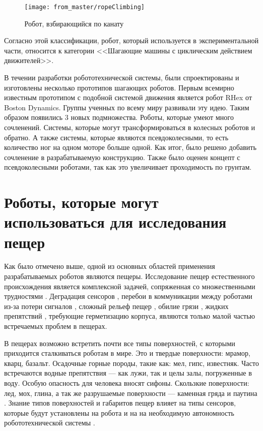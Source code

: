 \begin{figure}[H]
\centering\texttt{[image: from\_master/ropeClimbing]}
\caption{Робот, взбирающийся по канату}
\label{fig:ropeClimbing}
\end{figure}

Согласно этой классификации, робот, который используется в экспериментальной части, относится к категории <<Шагающие машины с циклическим действием движителей>>.

В течении разработки робототехнической системы, были спроектированы и изготовлены несколько прототипов шагающих роботов. Первым всемирно известным прототипом с подобной системой движения является робот RHex \cite{saranliRHexSimpleHighly2001} от Boston Dynamics. Группы ученных по всему миру развивали эту идею. Таким образом появились 3 новых подмножества. Роботы, которые умеют много сочленений. Системы, которые могут трансформироваться в колесных роботов и обратно. А также системы, которые являются псевдоколесными, то есть количество ног на одном моторе больше одной. Как итог, было решено добавить сочленение в разрабатываемую конструкцию. Также было оценен концепт с псевдоколесными роботами, так как это увеличивает проходимость по грунтам.

\section{Роботы, которые могут использоваться для исследования пещер}

Как было отмечено выше, одной из основных областей применения разрабатываемых роботов являются пещеры. Исследование пещер естественного происхождения является комплексной задачей, сопряженная со множественными трудностями \cite{Zhang2017a, Frumkin2019}. Деградация сенсоров \cite{Huang2019}, перебои в коммуникации между роботами из-за потери сигналов \cite{Vaquero2018, Thangavelautham2017}, сложный рельеф пещер \cite{Thangavelautham2017}, обилие грязи \cite{Baker2004}, жидких препятствий \cite{Morris2006}, требующие герметизацию корпуса, являются только малой частью встречаемых проблем в пещерах. 

В пещерах возможно встретить почти все типы поверхностей, с которыми приходится сталкиваться роботам в мире. Это и твердые поверхности: мрамор, кварц, базальт. Осадочные горные породы, такие как: мел, гипс, известняк. Часто встречаются водные препятствия — как лужи, так и целы залы, погруженные в воду. Особую опасность для человека вносят сифоны. Скользкие поверхности: лед, мох, глина, а так же разрушаемые поверхности — каменная гряда и паутина \cite{1960,1963,1969,1971}. Знание типов поверхностей и габаритов пещер влияет на типы сенсоров, которые будут установлены на робота и на на необходимую автономность робототехнической системы \cite{Mascarich2018a}. 

